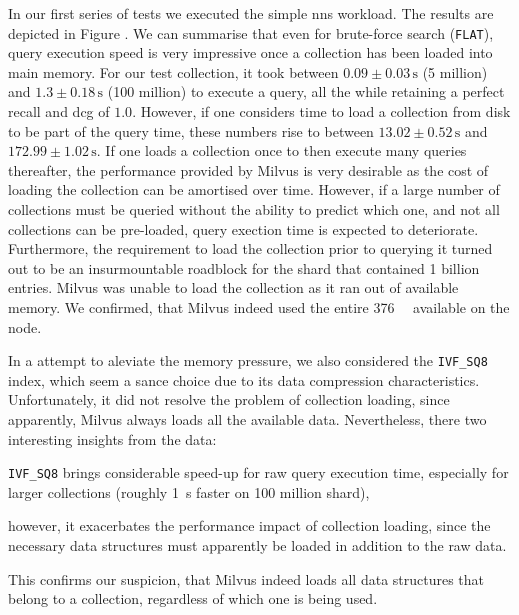 In our first series of tests we executed the simple \acrshort{nns} workload. The results are depicted in Figure . We can summarise that even for brute-force search (\texttt{FLAT}), query execution speed is very impressive once a collection has been loaded into main memory. For our test collection, it took between $0.09 \pm 0.03 \, \si{\second}$ (5 million) and $1.3 \pm 0.18 \, \si{\second}$ (100 million) to execute a query, all the while retaining a perfect recall and \acrshort{dcg} of $1.0$. However, if one considers time to load a collection from disk to be part of the query time, these numbers rise to between $13.02 \pm 0.52 \, \si{\second}$ and $172.99 \pm 1.02 \, \si{\second}$. If one loads a collection once to then execute many queries thereafter, the performance provided by Milvus is very desirable as the cost of loading the collection can be amortised over time. However, if a large number of collections must be queried without the ability to predict which one, and not all collections can be pre-loaded, query exection time is expected to deteriorate. Furthermore, the requirement to load the collection prior to querying it turned out to be an insurmountable roadblock for the shard that contained 1 billion entries. Milvus was unable to load the collection as it ran out of available memory. We confirmed, that Milvus indeed used the entire \SI{376}{\giga\byte} available on the node.

In a attempt to aleviate the memory pressure, we also considered the \texttt{IVF\_SQ8} index, which seem a sance choice due to its data compression characteristics. Unfortunately, it did not resolve the problem of collection loading, since apparently, Milvus always loads all the available data. Nevertheless, there two interesting insights from the data:
\begin{enumerate*}[label=(\roman*)]
    \item \texttt{IVF\_SQ8} brings considerable speed-up for raw query execution time, especially for larger collections (roughly \SI{1}{\second} faster on 100 million shard),
    \item however, it exacerbates the performance impact of collection loading, since the necessary data structures must apparently be loaded in addition to the raw data.
\end{enumerate*} This confirms our suspicion, that Milvus indeed loads all data structures that belong to a collection, regardless of which one is being used.

